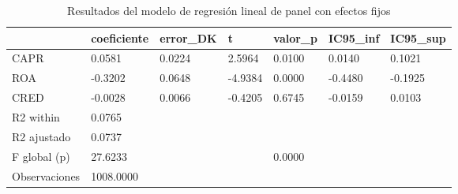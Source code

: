 \begin{table}[htbp]
\centering
\caption{Resultados del modelo de regresión lineal de panel con efectos fijos}
\begin{tabular}{lllllll}
\hline
 & coeficiente & error\_DK & t & valor\_p & IC95\_inf & IC95\_sup \\
\hline
CAPR & 0.0581 & 0.0224 & 2.5964 & 0.0100 & 0.0140 & 0.1021 \\
ROA & -0.3202 & 0.0648 & -4.9384 & 0.0000 & -0.4480 & -0.1925 \\
CRED & -0.0028 & 0.0066 & -0.4205 & 0.6745 & -0.0159 & 0.0103 \\
R2 within & 0.0765 &  &  &  &  &  \\
R2 ajustado & 0.0737 &  &  &  &  &  \\
F global (p) & 27.6233 &  &  & 0.0000 &  &  \\
Observaciones & 1008.0000 &  &  &  &  &  \\
\hline
\end{tabular}
\label{tab:tabla5b_regresion_detallada}
\end{table}